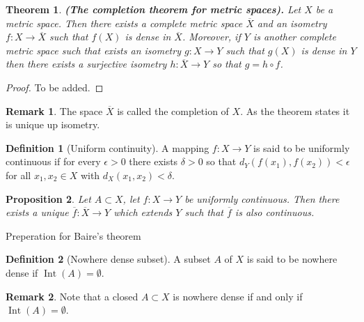 \documentclass[11pt,a4paper]{article}
\theoremstyle{definition}
\newtheorem{definition}{Definition}[section]
\newtheorem{remark}{Remark}[section]
\theoremstyle{plain}
\newtheorem{theorem}{Theorem}[section]
\newtheorem{proposition}[theorem]{Proposition}
\DeclareMathOperator{\Int}{Int}
\renewcommand{\tt}[1]{\textnormal{\textbf{(#1).}}} %
\begin{document}
  \begin{theorem}
    \tt{The completion theorem for metric spaces}
    Let $X$ be a metric space. Then there exists a complete metric space
    $\overline{X}$ and an isometry $f \colon X \to \overline{X}$ such that 
    $f(X)$ is dense in $\overline{X}$. Moreover, if $Y$ is another complete 
    metric space such that exists an isometry $g \colon X \to Y$ such that
    $g(X)$ is dense in $Y$ then there exists a surjective isometry
    $h \colon \overline{X} \to Y$ so that $g = h \circ f$.
  \end{theorem}
  \begin{proof}
    To be added.
  \end{proof}

  \begin{remark}
    The space $\overline{X}$ is called the completion of $X$. As the theorem
    states it is unique up isometry.
  \end{remark}
  
  \begin{definition}[Uniform continuity]
    A mapping $f \colon X \to Y$ is said to be uniformly continuous if for
    every $\epsilon > 0$ there exists $\delta > 0$ so that 
    $d_Y(f(x_1),f(x_2)) < \epsilon$ for all $x_1,x_2 \in X$ with 
    $d_X(x_1,x_2) < \delta$.
  \end{definition}
  
  \begin{proposition}
    Let $A \subset X$, let $f \colon X \to Y$ be uniformly continuous.
    Then there exists a unique $\overline{f} \colon \overline{X} \to Y$ 
    which extends $Y$ such that $\overline{f}$ is also continuous.
  
  \end{proposition}
  
  Preperation for Baire's theorem
  
  \begin{definition}[Nowhere dense subset]
    A subset $A$ of $X$ is said to be nowhere dense if $\Int(A) = \emptyset$.
  \end{definition}
  
  \begin{remark}
    Note that a closed $A \subset X$ is nowhere dense if and only if 
    $\Int(A) = \emptyset$.
  \end{remark}
  
\end{document}
